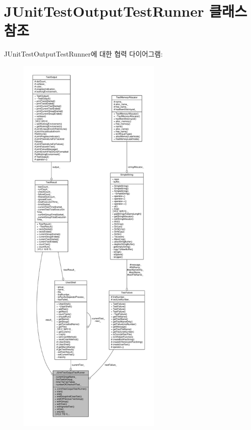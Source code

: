 \hypertarget{class_j_unit_test_output_test_runner}{}\section{J\+Unit\+Test\+Output\+Test\+Runner 클래스 참조}
\label{class_j_unit_test_output_test_runner}


J\+Unit\+Test\+Output\+Test\+Runner에 대한 협력 다이어그램\+:
\nopagebreak
\begin{figure}[H]
\begin{center}
\leavevmode
\includegraphics[height=550pt]{class_j_unit_test_output_test_runner__coll__graph}
\end{center}
\end{figure}
